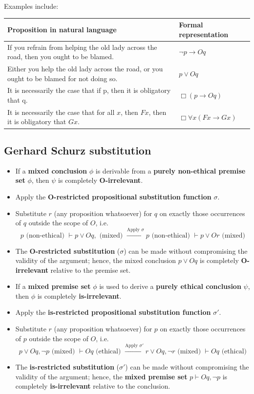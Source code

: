 \documentclass[11pt]{article}
\begin{document}
Examples include:
\begin{center}
\begin{tabular}{|m{25em}|m{5em}|}
\hline
Proposition in natural language & Formal representation\\
\hline
If you refrain from helping the old lady across the road, then you ought to be blamed. & \(\neg p \rightarrow Oq\)\\
\hline
Either you help the old lady across the road, or you ought to be blamed for not doing so. & \(p \vee Oq\)\\
\hline
It is necessarily the case that if p, then it is obligatory that q. & \(\Box (p \rightarrow Oq)\)\\
\hline
It is necessarily the case that for all \(x\), then \(Fx\), then it is obligatory that \(Gx\). & \(\Box \forall x (Fx \rightarrow Gx)\)\\
\hline
\end{tabular}
\end{center}
 \newpage
\subsection{Gerhard Schurz substitution}
\label{sec:orge7640e6}
\begin{itemize}
\item If a \textbf{mixed conclusion} \(\phi\) is derivable from a \textbf{purely non-ethical premise set} \(\phi\), then \(\psi\) is completely \textbf{O-irrelevant}.
\item Apply the \textbf{O-restricted propositional substitution function} \(\sigma\).
\item Substitute \(r\) (any proposition whatsoever) for \(q\) on exactly those occurrences of \(q\) outside the scope of \(O\), i.e.
\[p \text{ (non-ethical) } \vdash p \vee Oq,  \text{ (mixed) } \xrightarrow{\text{Apply } \sigma} p \text{ (non-ethical) } \vdash p \vee Or \text{ (mixed)}\]
\item The \textbf{O-restricted substitution} (\(\sigma\)) can be made without compromising the validity of the argument; hence, the mixed conclusion \(p \vee Oq\) is completely \textbf{O-irrelevant} relative to the premise set.
\item If a \textbf{mixed premise set} \(\phi\) is used to derive a \textbf{purely ethical conclusion} \(\psi\), then \(\phi\) is completely \textbf{is-irrelevant}.
\item Apply the \textbf{is-restricted propositional substitution function} \(\sigma'\).
\item Substitute \(r\) (any proposition whatsoever) for \(p\) on exactly those occurrences of \(p\) outside the scope of \(O\), i.e.
\[p \vee Oq, \neg p \text{ (mixed) } \vdash Oq \text{ (ethical) } \xrightarrow{\text{Apply } \sigma'} r \vee Oq, \neg r \text{ (mixed) } \vdash Oq \text{ (ethical)}\]
\item The \textbf{is-restricted substitution} (\(\sigma'\)) can be made without compromising the validity of the argument; hence, the \textbf{mixed premise set} \(p \vdash Oq, \neg p\) is completely \textbf{is-irrelevant} relative to the conclusion.
\end{itemize}
\end{document}
